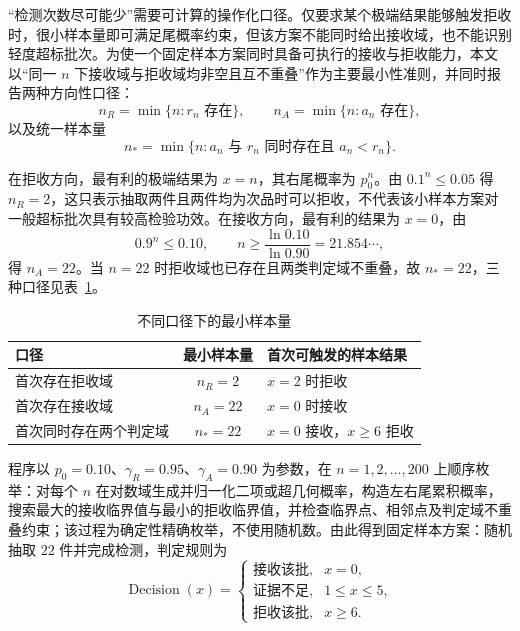 “检测次数尽可能少”需要可计算的操作化口径。仅要求某个极端结果能够触发拒收时，很小样本量即可满足尾概率约束，但该方案不能同时给出接收域，也不能识别轻度超标批次。为使一个固定样本方案同时具备可执行的接收与拒收能力，本文以“同一 $n$ 下接收域与拒收域均非空且互不重叠”作为主要最小性准则，并同时报告两种方向性口径：
\begin{equation}
  n_R=\min\{n:r_n\text{ 存在}\},\qquad
  n_A=\min\{n:a_n\text{ 存在}\},
  \label{eq:q1-min-directional-n}
\end{equation}
以及统一样本量
\begin{equation}
  n_*=\min\{n:a_n\text{ 与 }r_n\text{ 同时存在且 }a_n<r_n\}.
  \label{eq:q1-min-unified-n}
\end{equation}

在拒收方向，最有利的极端结果为 $x=n$，其右尾概率为 $p_0^n$。由 $0.1^n\le0.05$ 得 $n_R=2$，这只表示抽取两件且两件均为次品时可以拒收，不代表该小样本方案对一般超标批次具有较高检验功效。在接收方向，最有利的结果为 $x=0$，由
\[
  0.9^n\le0.10,\qquad
  n\ge\frac{\ln0.10}{\ln0.90}=21.854\cdots,
\]
得 $n_A=22$。当 $n=22$ 时拒收域也已存在且两类判定域不重叠，故 $n_*=22$，三种口径见表~\ref{tab:q1-minimum-samples}。

\begin{table}[H]
  \centering
  \caption{不同口径下的最小样本量}
  \label{tab:q1-minimum-samples}
  \begin{tabular}{p{}cp{}}
    \toprule
    口径 & 最小样本量 & 首次可触发的样本结果 \\
    \midrule
    首次存在拒收域 & $n_R=2$ & $x=2$ 时拒收 \\
    首次存在接收域 & $n_A=22$ & $x=0$ 时接收 \\
    首次同时存在两个判定域 & $n_*=22$ & $x=0$ 接收，$x\ge6$ 拒收 \\
    \bottomrule
  \end{tabular}
\end{table}

程序以 $p_0=0.10$、$\gamma_R=0.95$、$\gamma_A=0.90$ 为参数，在 $n=1,2,\ldots,200$ 上顺序枚举：对每个 $n$ 在对数域生成并归一化二项或超几何概率，构造左右尾累积概率，搜索最大的接收临界值与最小的拒收临界值，并检查临界点、相邻点及判定域不重叠约束；该过程为确定性精确枚举，不使用随机数。由此得到固定样本方案：随机抽取 $22$ 件并完成检测，判定规则为
\begin{equation}
  \operatorname{Decision}(x)=
  \begin{cases}
    \text{接收该批}, & x=0,\\
    \text{证据不足}, & 1\le x\le5,\\
    \text{拒收该批}, & x\ge6.
  \end{cases}
  \label{eq:q1-final-binomial-rule}
\end{equation}

